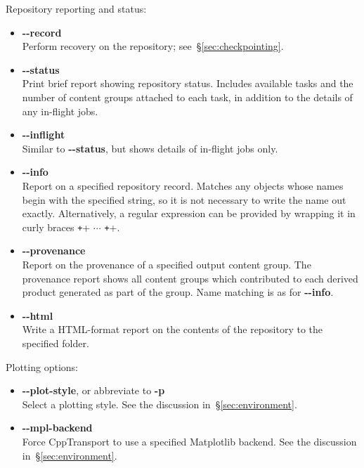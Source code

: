 \documentclass[11pt,a4paper]{article}
\newcommand{\packagefont}{\sffamily}
\newcommand{\CppTransport}{{\packagefont CppTransport}}
\newcommand{\Matplotlib}{{\packagefont Matplotlib}}
\newcommand{\option}[1]{{\ttfamily\bfseries\small #1}}
\begin{document}
\noindent Repository reporting and status:
\begin{itemize}
	\item \option{{-}{-}record} \\
	Perform recovery on the repository; see~\S\ref{sec:checkpointing}.
	
	\item \option{{-}{-}status} \\
	Print brief report showing repository status.
	Includes available tasks and the number of content groups
	attached to each task, in addition to the details of any
	in-flight jobs.
	
	\item \option{{-}{-}inflight} \\
	Similar to \option{{-}{-}status}, but shows details of in-flight jobs only.
	
	\item \option{{-}{-}info} \\
	Report on a specified repository record.
	Matches any objects whose names begin with the specified string, so it is
	not necessary to write the name out exactly.
	Alternatively, a regular expression can be provided by wrapping
	it in curly braces
	\texttt+{+ $\cdots$ \texttt+}+.
	
	\item \option{{-}{-}provenance} \\
	Report on the provenance of a specified output content group.
	The provenance report shows all content groups which contributed
	to each derived product generated as part of the group.
	Name matching is as for \option{{-}{-}info}.
	
	\item \option{{-}{-}html} \\
	Write a HTML-format report on the contents of the repository to
	the specified folder.
\end{itemize}

\noindent Plotting options:
\begin{itemize}
	\item \option{{-}{-}plot-style}, or abbreviate to \option{-p} \\
	Select a plotting style. See the discussion in~\S\ref{sec:environment}.	
	
	\item \option{{-}{-}mpl-backend} \\
	Force {\CppTransport} to use a specified {\Matplotlib} backend.
	See the discussion in~\S\ref{sec:environment}.
\end{itemize}
\end{document}
